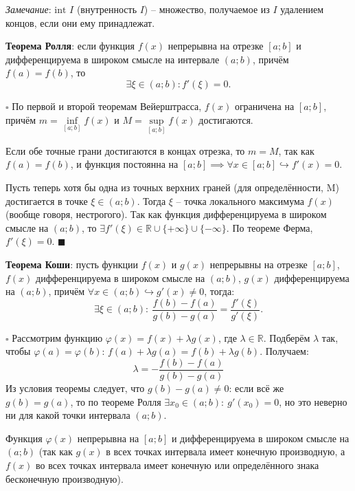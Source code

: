 \documentclass[12pt, a4paper, reqno]{article}
\begin{document}
    \textit{Замечание}: $\text{int }I$ (внутренность $I$) -- множество, получаемое из $I$ удалением
    концов, если они ему принадлежат.

    \textbf{Теорема Ролля}: если функция $f(x)$ непрерывна на отрезке $[a; b]$ и дифференцируема в
    широком смысле на интервале $(a; b)$, причём $f(a) = f(b)$, то
    \begin{equation*}
        \exists\xi\in(a; b): f'(\xi) = 0.
    \end{equation*}

    $\square$ По первой и второй теоремам Вейерштрасса, $f(x)$ ограничена на $[a; b]$, причём
    $m = \inf\limits_{[a; b]} f(x)$ и $M = \sup\limits_{[a; b]} f(x)$ достигаются.

    Если обе точные грани достигаются в концах отрезка, то $m = M$, так как $f(a) = f(b)$, и функция
    постоянна на $[a; b] \implies \forall x\in[a; b]\hookrightarrow f'(x) = 0$.

    Пусть теперь хотя бы одна из точных верхних граней (для определённости, M) достигается в точке
    $\xi\in(a; b)$. Тогда $\xi$ -- точка локального максимума $f(x)$ (вообще говоря, нестрогого). Так
    как функция дифференцируема в широком смысле на $(a; b)$, то
    $\exists f'(\xi)\in\mathbb{R}\cup\{+\infty\}\cup\{-\infty\}$. По теореме Ферма, $f'(\xi) = 0$.
    $\blacksquare$

    \textbf{Теорема Коши}: пусть функции $f(x)$ и $g(x)$ непрерывны на отрезке $[a; b]$, $f(x)$
    дифференцируема в широком смысле на $(a; b)$, $g(x)$ дифференцируема на $(a; b)$, причём
    $\forall x\in(a; b)\hookrightarrow g'(x)\neq 0$, тогда:
    \begin{equation*}
    \exists\xi\in(a; b):\ \dfrac{f(b) - f(a)}{g(b) - g(a)} = \dfrac{f'(\xi)}{g'(\xi)}.
    \end{equation*}

    $\square$ Рассмотрим функцию $\varphi(x) = f(x) + \lambda g(x)$, где $\lambda\in\mathbb{R}$.
    Подберём $\lambda$ так, чтобы $\varphi(a) = \varphi(b)$: $f(a) + \lambda g(a) = f(b) + \lambda
    g(b)$. Получаем:
    \begin{equation*}
        \lambda = -\dfrac{f(b) - f(a)}{g(b) - g(a)}
    \end{equation*}
    Из условия теоремы следует, что $g(b) - g(a)\neq 0$: если всё же $g(b) = g(a)$, то по теореме
    Ролля $\exists x_0\in(a; b):\ g'(x_0) = 0$, но это неверно ни для какой точки интервала $(a; b)$.

    Функция $\varphi(x)$ непрерывна на $[a; b]$ и дифференцируема в широком смысле на $(a; b)$ (так
    как $g(x)$ в всех точках интервала имеет конечную производную, а $f(x)$ во всех точках интервала
    имеет конечную или определённого знака бесконечную производную).
\end{document}
